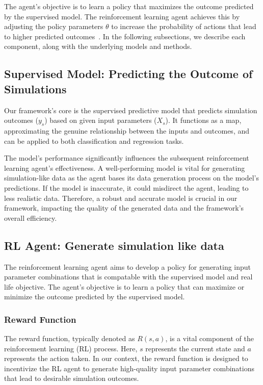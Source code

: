 \documentclass{article}
\begin{document}
The agent's objective is to learn a policy that maximizes the outcome predicted by the supervised model. The reinforcement learning agent achieves this by adjusting the policy parameters $\theta$ to increase the probability of actions that lead to higher predicted outcomes~\cite{sutton2018reinforcement}. In the following subsections, we describe each component, along with the underlying models and methods.

\subsection{Supervised Model: Predicting the Outcome of Simulations}

Our framework's core is the supervised predictive model that predicts simulation outcomes ($y_s$) based on given input parameters ($X_s$). It functions as a map, approximating the genuine relationship between the inputs and outcomes, and can be applied to both classification and regression tasks.

The model's performance significantly influences the subsequent reinforcement learning agent's effectiveness. A well-performing model is vital for generating simulation-like data as the agent bases its data generation process on the model's predictions. If the model is inaccurate, it could misdirect the agent, leading to less realistic data. Therefore, a robust and accurate model is crucial in our framework, impacting the quality of the generated data and the framework's overall efficiency.

\subsection{RL Agent: Generate simulation like data}

The reinforcement learning agent aims to develop a policy for generating input parameter combinations that is compatable with the supervised model and real life objective.  The agent's objective is to learn a policy that can maximize or minimize the outcome predicted by the supervised model.

\subsubsection{Reward Function}

The reward function, typically denoted as $R(s,a)$, is a vital component of the reinforcement learning (RL) process. Here, $s$ represents the current state and $a$ represents the action taken. In our context, the reward function is designed to incentivize the RL agent to generate high-quality input parameter combinations that lead to desirable simulation outcomes.
\end{document}
